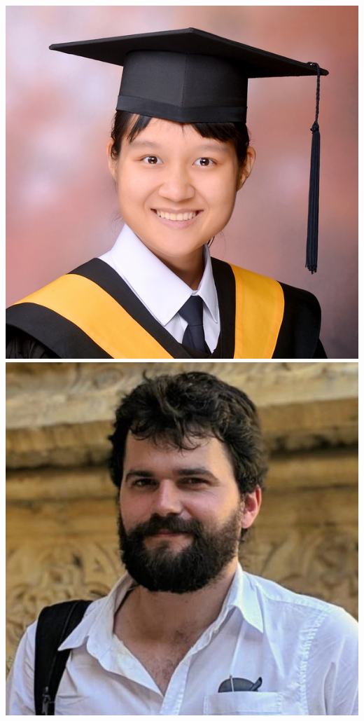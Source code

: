 \documentclass[aspectratio=169]{beamer}
\begin{document}
\begin{frame}
{        \includegraphics[width=0.06\textheight]{people/wei-ning_deng.jpg}%
        \includegraphics[width=0.06\textheight]{people/will_handley.jpg}%
}
\end{frame}
\end{document}
